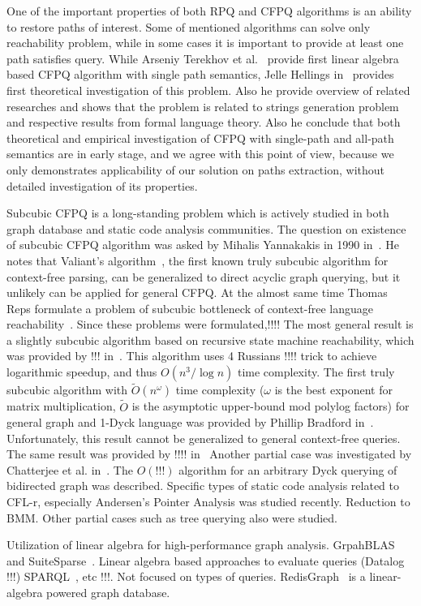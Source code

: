 One of the important properties of both RPQ and CFPQ algorithms is an ability to restore paths of interest. 
Some of mentioned algorithms can solve only reachability problem, while in some cases it is important to provide at least one path satisfies query. 
While Arseniy Terekhov et al.~\cite{10.1145/3398682.3399163} provide first linear algebra based CFPQ algorithm with single path semantics, Jelle Hellings in~\cite{!!!} provides first theoretical investigation of this problem. Also he provide overview of related researches and shows that the problem is related to strings generation problem and respective results from formal language theory.
Also he conclude that both theoretical and empirical investigation of CFPQ with single-path and all-path semantics are in early stage, and we agree with this point of view, because we only demonstrates applicability of our solution on paths extraction, without detailed investigation of its properties.

Subcubic CFPQ is a long-standing problem which is actively studied in both graph database and static code analysis communities.
The question on existence of subcubic CFPQ algorithm was asked by Mihalis Yannakakis in 1990 in~\cite{Yannakakis}.
He notes that Valiant's algorithm~\cite{10.1016/S0022-0000(75)80046-8}, the first known truly subcubic algorithm for context-free parsing, can be generalized to direct acyclic graph querying, but it unlikely can be applied for general CFPQ. 
At the almost same time Thomas Reps formulate a problem of subcubic bottleneck of context-free language reachability~\cite{!!!}.
Since these problems were formulated,!!!!
The most general result is a slightly subcubic algorithm based on recursive state machine reachability, which was provided by !!! in~\cite{rsm:analysis:10.1007/3-540-44585-4_18}. This algorithm uses 4 Russians !!!! trick to achieve logarithmic speedup, and thus $O(n^3/\log{n})$ time complexity. 
The first truly subcubic algorithm with $\widetilde{O}(n^\omega)$ time complexity ($\omega$ is the best exponent for matrix multiplication, $\widetilde{O}$ is the asymptotic upper-bound mod polylog factors) for general graph and 1-Dyck language was provided by Phillip Bradford in~\cite{Bradford2017EfficientEP}. Unfortunately, this result cannot be generalized to general context-free queries.
The same result was provided by !!!! in~\cite{zhang2020conditional,pavlogiannis2020finegrained}
Another partial case was investigated by Chatterjee et al. in~\cite{10.1145/3158118}.
The $O(!!!)$ algorithm for an arbitrary Dyck querying of bidirected graph was described.
Specific types of static code analysis related to CFL-r, especially Andersen's Pointer Analysis was studied recently. Reduction to BMM.
Other partial cases such as tree querying also were studied.

Utilization of linear algebra for high-performance graph analysis.
GrpahBLAS~\cite{!!!} and SuiteSparse~\cite{!!!}.
Linear algebra based approaches to evaluate queries (Datalog !!!) SPARQL~\cite{10.1145/3302424.3303962,DBLP:journals/corr/MetzlerM15a}, etc !!!. 
Not focused on types of queries.
RedisGraph~\cite{8778293} is a linear-algebra powered graph database.